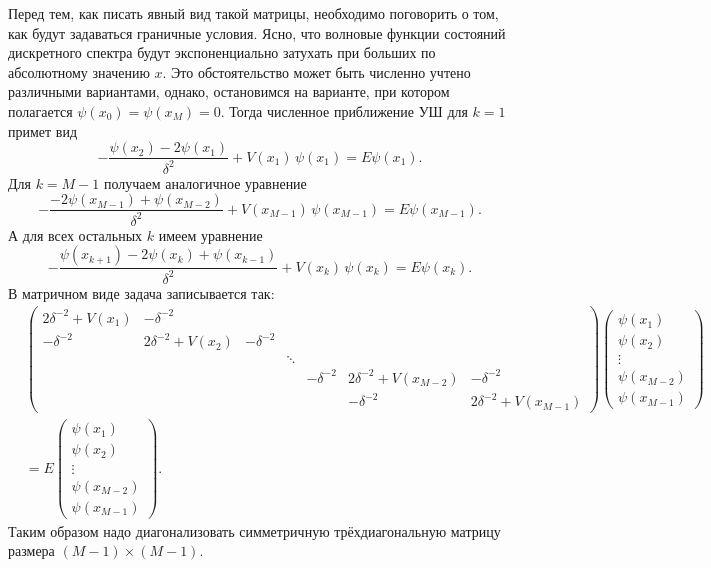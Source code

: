 \documentclass[10pt]{article}
\begin{document}
Перед тем, как писать явный вид такой матрицы, необходимо поговорить о том, как будут задаваться граничные условия. Ясно, что волновые функции состояний дискретного спектра будут экспоненциально затухать при больших по абсолютному значению $x$. Это обстоятельство может быть численно учтено различными вариантами, однако, остановимся на варианте, при котором полагается $\psi(x_0) = \psi(x_M) = 0$. Тогда численное приближение УШ для $k=1$ примет вид
\begin{equation}
    -\dfrac{\psi(x_{2}) - 2\psi(x_{1})}{\delta^2} + V(x_1)\,\psi(x_1) = E\psi(x_1).
\end{equation}
Для $k=M-1$ получаем аналогичное уравнение
\begin{equation}
    -\dfrac{-2\psi(x_{M-1})+\psi(x_{M-2}) }{\delta^2} + V(x_{M-1})\,\psi(x_{M-1}) = E\psi(x_{M-1}).
\end{equation}
А для всех остальных $k$ имеем уравнение
\begin{equation}
    -\dfrac{\psi(x_{k+1}) - 2\psi(x_{k}) + \psi(x_{k-1})}{\delta^2} + V(x_k)\,\psi(x_k) = E\psi(x_k).
\end{equation}
В матричном виде задача записывается так:
\begin{equation}
\begin{split}
    &\begin{pmatrix}
        2\delta^{-2}+V(x_1)& -\delta^{-2}\\
        -\delta^{-2}& 2\delta^{-2}+V(x_2)& -\delta^{-2}\\
        & & & \ddots&\\
        & & & & -\delta^{-2}& 2\delta^{-2}+V(x_{M-2})& -\delta^{-2}\\
        & & & & & -\delta^{-2}& 2\delta^{-2}+V(x_{M-1})
    \end{pmatrix}
    \begin{pmatrix}
        \psi(x_1)\\
        \psi(x_2)\\
        \vdots\\
        \psi(x_{M-2})\\
        \psi(x_{M-1})
    \end{pmatrix}\\
    &=E
    \begin{pmatrix}
        \psi(x_1)\\
        \psi(x_2)\\
        \vdots\\
        \psi(x_{M-2})\\
        \psi(x_{M-1})
    \end{pmatrix}.
\end{split}
\end{equation}
Таким образом надо диагонализовать симметричную трёхдиагональную матрицу размера $(M-1)\times(M-1)$.
\end{document}
